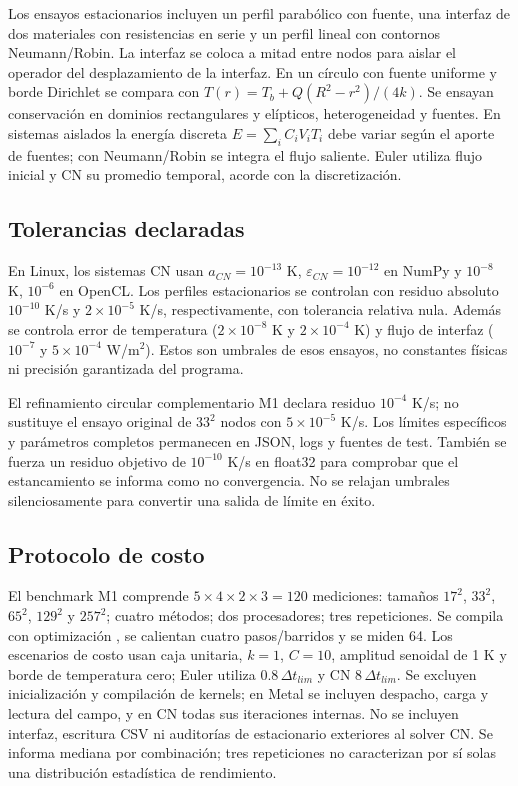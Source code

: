 \documentclass[11pt,a4paper]{article}
\newcommand{\code}[1]{\texttt{\detokenize{#1}}}
\newcommand{\dt}{\Delta t}
\begin{document}
Los ensayos estacionarios incluyen un perfil parabólico con fuente, una interfaz de dos materiales con resistencias en serie y un perfil lineal con contornos Neumann/Robin. La interfaz se coloca a mitad entre nodos para aislar el operador del desplazamiento de la interfaz. En un círculo con fuente uniforme y borde Dirichlet se compara con $T(r)=T_b+Q(R^2-r^2)/(4k)$. Se ensayan conservación en dominios rectangulares y elípticos, heterogeneidad y fuentes. En sistemas aislados la energía discreta $E=\sum_iC_iV_iT_i$ debe variar según el aporte de fuentes; con Neumann/Robin se integra el flujo saliente. Euler utiliza flujo inicial y CN su promedio temporal, acorde con la discretización.

\subsection{Tolerancias declaradas}
En Linux, los sistemas CN usan $a_{CN}=10^{-13}$ K, $\varepsilon_{CN}=10^{-12}$ en NumPy y $10^{-8}$ K, $10^{-6}$ en OpenCL. Los perfiles estacionarios se controlan con residuo absoluto $10^{-10}$ K/s y $2\times10^{-5}$ K/s, respectivamente, con tolerancia relativa nula. Además se controla error de temperatura ($2\times10^{-8}$ K y $2\times10^{-4}$ K) y flujo de interfaz ($10^{-7}$ y $5\times10^{-4}$ W/m$^2$). Estos son umbrales de esos ensayos, no constantes físicas ni precisión garantizada del programa.

El refinamiento circular complementario M1 declara residuo $10^{-4}$ K/s; no sustituye el ensayo original de $33^2$ nodos con $5\times10^{-5}$ K/s. Los límites específicos y parámetros completos permanecen en JSON, logs y fuentes de test. También se fuerza un residuo objetivo de $10^{-10}$ K/s en float32 para comprobar que el estancamiento se informa como no convergencia. No se relajan umbrales silenciosamente para convertir una salida de límite en éxito.

\subsection{Protocolo de costo}
El benchmark M1 comprende $5\times4\times2\times3=120$ mediciones: tamaños $17^2$, $33^2$, $65^2$, $129^2$ y $257^2$; cuatro métodos; dos procesadores; tres repeticiones. Se compila con optimización \code{-O}, se calientan cuatro pasos/barridos y se miden 64. Los escenarios de costo usan caja unitaria, $k=1$, $C=10$, amplitud senoidal de 1 K y borde de temperatura cero; Euler utiliza $0.8\,\dt_{lim}$ y CN $8\,\dt_{lim}$. Se excluyen inicialización y compilación de kernels; en Metal se incluyen despacho, carga y lectura del campo, y en CN todas sus iteraciones internas. No se incluyen interfaz, escritura CSV ni auditorías de estacionario exteriores al solver CN. Se informa mediana por combinación; tres repeticiones no caracterizan por sí solas una distribución estadística de rendimiento.
\end{document}
